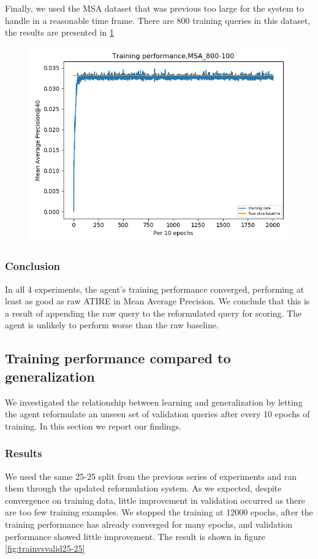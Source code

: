 Finally, we used the MSA dataset that was previous too large for the system to handle in a reasonable time frame. There are 800 training queries in this dataset, the results are presented in \ref{fig:trainingmsa}

\begin{figure}[H]
	\centering
	\includegraphics[width=0.7\linewidth]{images/chapter_4/second_system/training_msa}
	\caption{}
	\label{fig:trainingmsa}
\end{figure}




\subsubsection{Conclusion}

In all 4 experiments, the agent's training performance converged, performing at least as good as raw ATIRE in Mean Average Precision. We conclude that this is a result of appending the raw query to the reformulated query for scoring. The agent is unlikely to perform worse than the raw baseline. 

\subsection{Training performance compared to generalization}
We investigated the relationship between learning and generalization by letting the agent reformulate an unseen set of validation queries after every 10 epochs of training. In this section we report our findings.

\subsubsection{Results}

We used the same 25-25 split from the previous series of experiments and ran them through the updated reformulation system. As we expected, despite convergence on training data,  little improvement in validation occurred as there are too few training examples. We stopped the training at 12000 epochs, after the training performance has already converged for many epochs, and validation performance showed little improvement. The result is shown in figure \ref{fig:trainvsvalid25-25}

